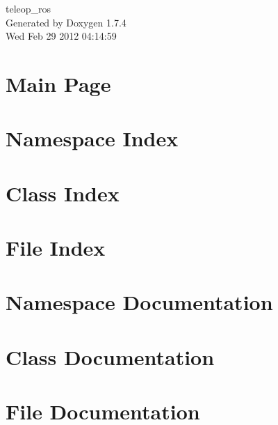\documentclass[a4paper]{book}
\begin{document}
\begin{titlepage}
\vspace*{7cm}
\begin{center}
{\Large teleop\_\-ros }\\
\vspace*{1cm}
{\large Generated by Doxygen 1.7.4}\\
\vspace*{0.5cm}
{\small Wed Feb 29 2012 04:14:59}\\
\end{center}
\end{titlepage}
\clearemptydoublepage
{}
\tableofcontents
\clearemptydoublepage
{}
\chapter{Main Page}
\label{index}
\chapter{Namespace Index}

\chapter{Class Index}

\chapter{File Index}

\chapter{Namespace Documentation}

\chapter{Class Documentation}


\chapter{File Documentation}







\printindex
\end{document}
